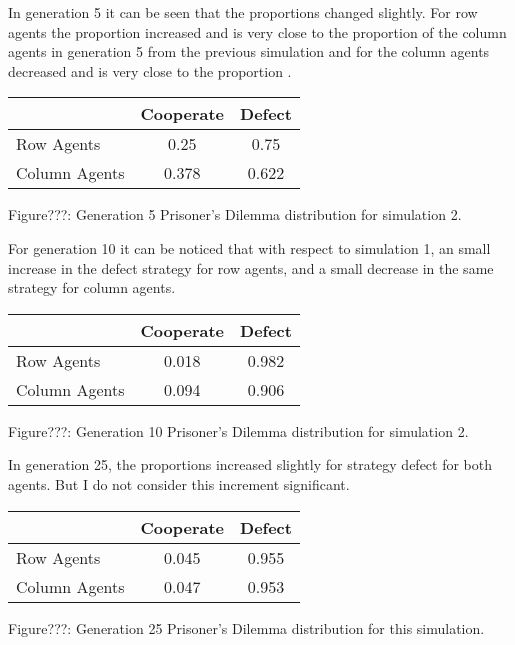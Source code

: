 \documentclass{article}
\begin{document}
In generation 5 it can be seen that the proportions changed slightly. For row agents the proportion increased and is very close to the proportion of the column agents in generation 5 from the previous simulation and for the column agents decreased and is very close to the proportion . 
\begin{center}
\begin{tabular}{|l|c|c|}
\hline
& Cooperate & Defect \\ 
\hline
Row Agents & 0.25 & 0.75\\
\hline
Column Agents & 0.378 & 0.622\\
\hline
\end{tabular}
\end{center}
\begin{center}
Figure???: Generation 5 Prisoner’s Dilemma distribution for simulation 2.
\end{center}

For generation 10 it can be noticed that with respect to simulation 1, an small increase in the defect strategy for row agents, and a small decrease in the same strategy for column agents. 
\begin{center}
\begin{tabular}{|l|c|c|}
\hline
& Cooperate & Defect \\ 
\hline
Row Agents & 0.018 & 0.982\\
\hline
Column Agents & 0.094 & 0.906\\
\hline
\end{tabular}
\end{center}
\begin{center}
Figure???: Generation 10 Prisoner’s Dilemma distribution for simulation 2.
\end{center}

In generation 25, the proportions increased slightly for strategy defect for both agents. But I do not consider this increment significant.
\begin{center}
\begin{tabular}{|l|c|c|}
\hline
& Cooperate & Defect \\ 
\hline
Row Agents & 0.045 & 0.955\\
\hline
Column Agents & 0.047 & 0.953\\
\hline
\end{tabular}
\end{center}
\begin{center}
Figure???: Generation 25 Prisoner’s Dilemma distribution for this simulation.
\end{center}
\end{document}
